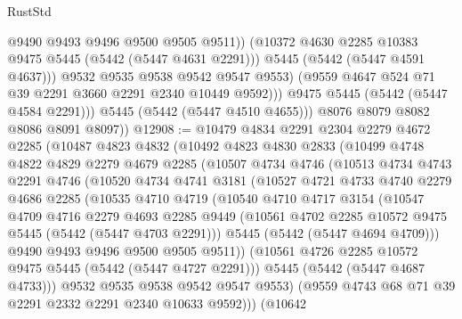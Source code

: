 \begin{lexlean}{RustStd}
\begin{coremodule}
                        @9490
                        @9493
                        @9496
                        @9500
                        @9505
                        @9511))
                    (@10372 @4630 @2285 @10383 @9475 @5445 (@5442 (@5447 @4631 @2291)))
                    @5445
                    (@5442 (@5447 @4591 @4637)))
                  @9532
                  @9535
                  @9538
                  @9542
                  @9547
                  @9553)
                (@9559 @4647 @524 @71 @39 @2291 @3660 @2291 @2340 @10449 @9592)))
            @9475
            @5445
            (@5442 (@5447 @4584 @2291)))
          @5445
          (@5442 (@5447 @4510 @4655)))
        @8076
        @8079
        @8082
        @8086
        @8091
        @8097))
@12908 := @10479
    @4834
    @2291
    @2304
    @2279
    @4672
    @2285
    (@10487
      @4823
      @4832
      (@10492
        @4823
        @4830
        @2833
        (@10499
          @4748
          @4822
          @4829
          @2279
          @4679
          @2285
          (@10507
            @4734
            @4746
            (@10513
              @4734
              @4743
              @2291
              @4746
              (@10520
                @4734
                @4741
                @3181
                (@10527
                  @4721
                  @4733
                  @4740
                  @2279
                  @4686
                  @2285
                  (@10535
                    @4710
                    @4719
                    (@10540
                      @4710
                      @4717
                      @3154
                      (@10547
                        @4709
                        @4716
                        @2279
                        @4693
                        @2285
                        @9449
                        (@10561 @4702 @2285 @10572 @9475 @5445 (@5442 (@5447 @4703 @2291)))
                        @5445
                        (@5442 (@5447 @4694 @4709)))
                      @9490
                      @9493
                      @9496
                      @9500
                      @9505
                      @9511))
                  (@10561 @4726 @2285 @10572 @9475 @5445 (@5442 (@5447 @4727 @2291)))
                  @5445
                  (@5442 (@5447 @4687 @4733)))
                @9532
                @9535
                @9538
                @9542
                @9547
                @9553)
              (@9559 @4743 @68 @71 @39 @2291 @2332 @2291 @2340 @10633 @9592)))
          (@10642

\end{coremodule}
\end{lexlean}

